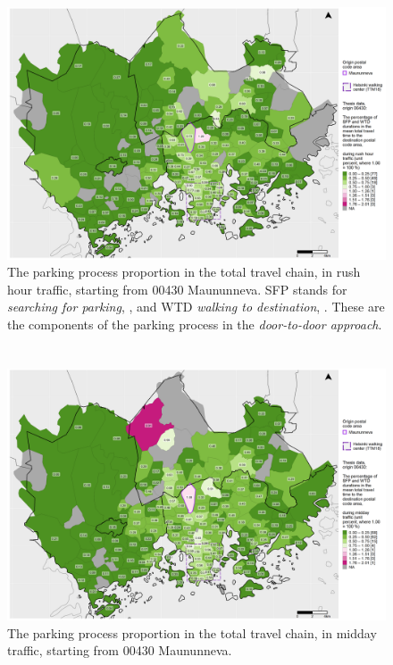 \begin{figure}
    \section{}
    \centering
    \includegraphics[trim={0.9cm 0.3cm 0.25cm 0.3cm},clip,width=\textwidth]{images/compare_traveltimes_mapfill-msc_r_pct_fromzip-00430_16-10-2020.png}
    \caption[Parking process proportion from Maununneva, rush hour traffic]{The parking process proportion in the total travel chain, in rush hour traffic, starting from 00430 Maununneva. SFP stands for \textit{searching for parking}, , and WTD \textit{walking to destination}, . These are the components of the parking process in the \textit{door-to-door approach}.}%
    \label{fig:compare_msc_r_pct_00430}%
\end{figure}

\begin{figure}
    \section{}
    \centering
    \includegraphics[trim={0.9cm 0.3cm 0.25cm 0.3cm},clip,width=\textwidth]{images/compare_traveltimes_mapfill-msc_m_pct_fromzip-00430_16-10-2020.png}
    \caption[Parking process proportion from Maununneva, midday traffic]{The parking process proportion in the total travel chain, in midday traffic, starting from 00430 Maununneva.}%
    \label{fig:compare_msc_m_pct_00430}%
\end{figure}

